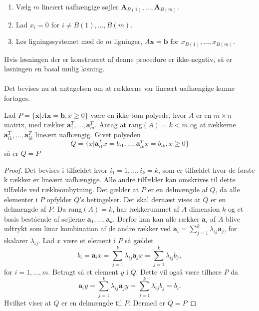\begin{enumerate}
\item Vælg $m$ lineært uafhængige søjler $\textbf{A}_{B(1)},\ldots,\textbf{A}_{B(m)}.$
\item Lad $x_i=0$ for $i \neq B(1),\ldots,B(m).$
\item Løs ligningssystemet med de $m$ ligninger, $A\textbf{x}=\textbf{b}$ for $x_{B(1)}, \ldots , x_{B(m)}.$
\end{enumerate}
Hvis løsningen der er konstrueret af denne procedure er ikke-negativ, så er løsningen en basal mulig løsning.
\\\\
\noindent
Det bevises nu at antagelsen om at rækkerne var lineært uafhængige kunne fortages.
\begin{thm}{}{}
Lad $P=\{\textbf{x}|A\textbf{x}=\textbf{b},x\geq 0\}$ være en ikke-tom polyede, hvor $A$ er en $m \times n$ matrix, med rækker $\textbf{a}^{T}_{1},\ldots,\textbf{a}^{T}_{m}$.
Antag at rang$(A)=k<m$ og at rækkerne $\textbf{a}^T_{i1},\ldots,\textbf{a}^T_{ik}$ lineært uafhængig. Givet polyeden 
$$Q=\{x|\textbf{a}^T_{i1}x=b_{i1},\ldots,\textbf{a}^T_{ik}x=b_{ik}, x \geq 0  \}$$ 
så er $Q=P$
\end{thm}
\begin{proof}
Det bevises i tilfældet hvor $i_1=1,\ldots,i_k=k$, som er tilfældet hvor de første k rækker er lineært uafhængige. 
Alle andre tilfælder kan omskrives til dette tilfælde ved rækkeombytning. 
Det gælder at $P$ er en delmængde af $Q$, da alle elementer i $P$ opfylder $Q$'s betingelser. 
Det skal dernæst vises at $Q$ er en delmængde af $P$.
Da rang$(A)=k$, har rækkerummet af $A$ dimension $k$ og et basis bestående af søjlerne $\textbf{a}_1,\ldots,\textbf{a}_k$. Derfor kan kan alle rækker $\textbf{a}_i$ af $A$ blive udtrykt som linar kombination af de andre rækker ved $\textbf{a}_i=\sum^{k}_{j=1}\lambda_{ij}\textbf{a}_j$, for skalarer $\lambda_{ij}$. Lad $x$ være et element i $P$ så gældet
$$b_i=\textbf{a}_ix=\sum^{k}_{j=1}\lambda_{ij}\textbf{a}_jx=\sum^{k}_{j=1}\lambda_{ij}b_j,$$
for $i=1,\ldots,m.$
Betragt så et element $y$ i $Q$. Dette vil også være tilhøre $P$ da
$$ \textbf{a}_iy=\sum^{k}_{j=1}\lambda_{ij}\textbf{a}_jy=\sum^{k}_{j=1}\lambda_{ij}b_j=b_i.$$
Hvilket viser at $Q$ er en delmængde til $P$. Dermed er $Q=P$

\end{proof}
